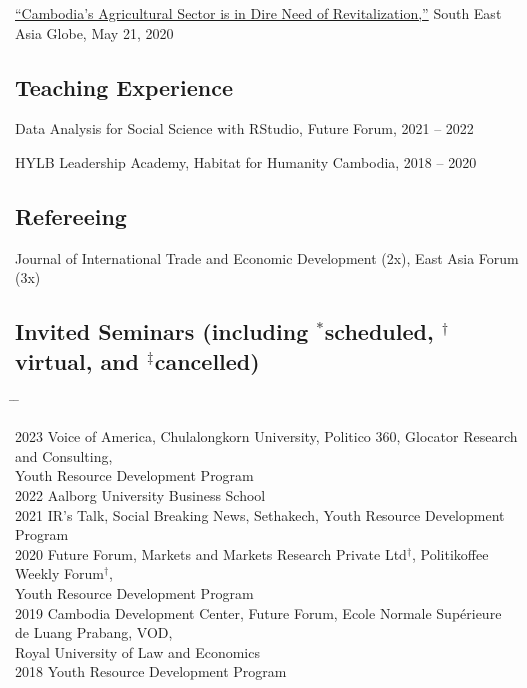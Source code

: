 \documentclass[10pt,a4paper]{article}
\newcommand{\tabbedblock}[1]{

	\begin{tabbing}
		\hspace{2cm} \= \hspace{4cm} \= \kill
		#1
	\end{tabbing}
}
\begin{document}
	 \href{https://southeastasiaglobe.com/cambodias-agricultural-sector-is-one-in-dire-need-of-revitalising}{``Cambodia’s Agricultural Sector is in Dire Need of Revitalization,''} South East Asia Globe, May 21, 2020

\subsection*{Teaching Experience}

Data Analysis for Social Science with RStudio, Future Forum, 2021 -- 2022
	
HYLB Leadership Academy, Habitat for Humanity Cambodia, 2018 -- 2020

\subsection*{Refereeing}
	
	Journal of International Trade and Economic Development (2x), East Asia Forum (3x)

\subsection*{Invited Seminars (including $^\ast$scheduled, $^\dag$virtual, and $^\ddag$cancelled)}

\tabbedblock{
	2023 \> Voice of America, Chulalongkorn University, Politico 360, Glocator Research and Consulting, \\ 
	\> Youth Resource Development Program \\
	
	2022 \> Aalborg University Business School \\
	
	2021  \>  IR’s Talk, Social Breaking News, Sethakech, Youth Resource Development Program \\
	
	2020 \>  Future Forum, Markets and Markets Research Private Ltd$^\dag$, Politikoffee Weekly Forum$^\dag$, \\
	\> Youth Resource Development Program \\
	
	2019 \> Cambodia Development Center, Future Forum, Ecole Normale Supérieure de Luang Prabang, VOD, \\
	\> Royal University of Law and Economics \\
	
	2018 \> Youth Resource Development Program
}
	
\end{document}
